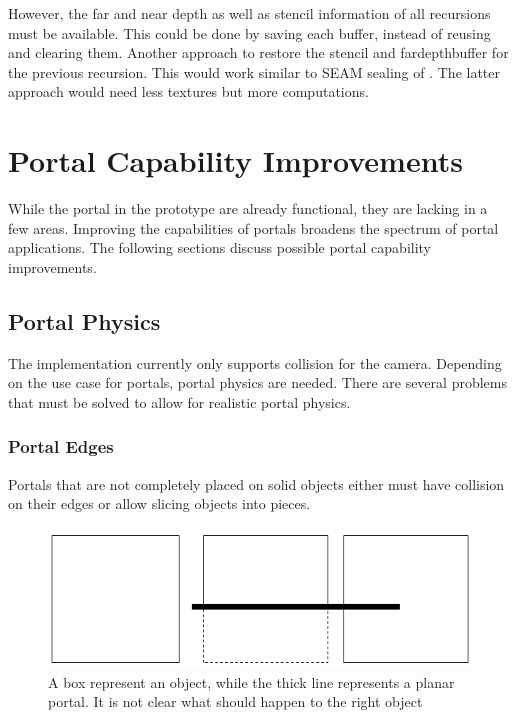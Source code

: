 However, the far and near depth as well as stencil information of all recursions must be available. This could be done by saving each buffer, instead of reusing and clearing them. Another approach to restore the stencil and \gls{fardepthbuffer} for the previous recursion. This would work similar to SEAM sealing of \textcite{schmalstieg:1999:sewing}. The latter approach would need less textures but more computations.

\chapter{Portal Capability Improvements}
While the portal in the prototype are already functional, they are lacking in a few areas. Improving the capabilities of portals broadens the spectrum of portal applications. The following sections discuss possible portal capability improvements.


\section{Portal Physics}
\label{section:portalphysics}
The implementation currently only supports collision for the camera. Depending on the use case for portals, portal physics are needed. There are several problems that must be solved to allow for realistic portal physics.

\subsection{Portal Edges}
Portals that are not completely placed on solid objects either must have collision on their edges or allow slicing objects into pieces.

\begin{figure}[h]
	\centering
	\includegraphics[width=\linewidth]{images/edgecollision.png}
	\caption{A box represent an object, while the thick line represents a planar portal. It is not clear what should happen to the right object}
	\label{fig:edgecollision}
\end{figure}

